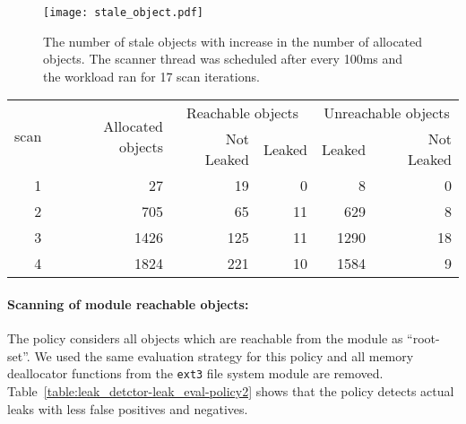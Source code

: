 \begin{figure}[t]
\begin{center}
\texttt{[image: stale\_object.pdf]}
\end{center}
\caption[Profile of stale object during leak scan.]{\label{fig:leak_detector-stale}The number of stale objects with increase in the number of allocated objects. The scanner thread was scheduled after every 100ms and the workload ran for 17 scan iterations.}
\end{figure}

\begin{table*}
\begin{center}
\begin{tabular}{|r|r|r|r|r|r|}
  \hline
  \multirow{2}{*}{scan} & \multirow{2}{*}{Allocated objects} & \multicolumn{2}{|c|}{Reachable objects} & \multicolumn{2}{|c|}{Unreachable objects} \\
  \hhline{~~----}
  & & Not Leaked & Leaked & Leaked & Not Leaked\\
  \hline
  1 & 27 & 19 & 0 & 8 & 0 \\
  \hline
  2 & 705 & 65 & 11 & 629 & 8 \\
  \hline
  3 & 1426 & 125 & 11 & 1290 & 18 \\
    \hline
  4 & 1824 & 221 & 10 & 1584 & 9 \\ \hline
  \hline
\end{tabular}
\caption[Profile of allocated objects with leak scan policies. The collector performs scan on all module reachable objects.]{\label{table:leak_detctor-leak_eval-policy2}The profile of the allocated objects and detected memory leaks when the scanner thread (collector) uses module reachable objects as ``root-set'' and performs reachability analysis.}
\end{center}
\end{table*}

\paragraph{Scanning of module reachable objects:} The policy considers all objects which are reachable from the module as ``root-set''. We used the same evaluation strategy for this policy and all memory deallocator functions from the \texttt{ext3} file system module are removed. Table~\ref{table:leak_detctor-leak_eval-policy2} shows that the policy detects actual leaks with less false positives and negatives.



